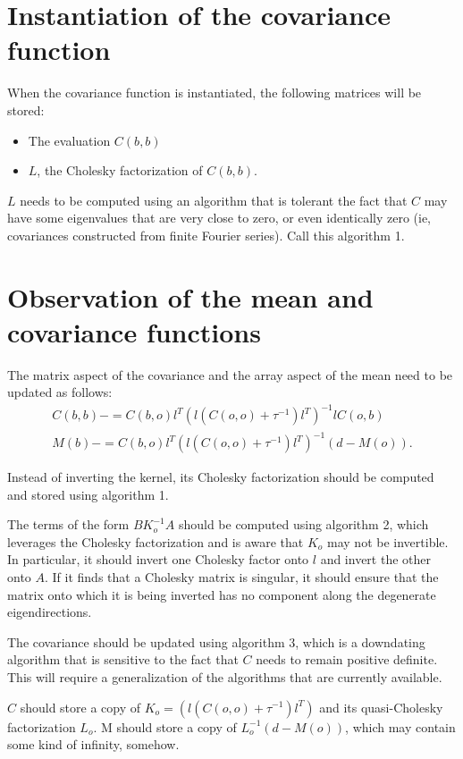 \documentclass{manual}
\begin{document}
\begin{itemize}
\section{Instantiation of the covariance function}\label{sec:covInstant} 
When the covariance function is instantiated, the following matrices will be stored:
\begin{itemize}
	\item The evaluation $C(b,b)$
	\item $L$, the Cholesky factorization of $C(b,b)$.
\end{itemize}
$L$ needs to be computed using an algorithm that is tolerant the fact that $C$ may have some eigenvalues that are very close to zero, or even identically zero (ie, covariances constructed from finite Fourier series). Call this algorithm 1.

\section{Observation of the mean and covariance functions}\label{sec:obsNumerics} 
The matrix aspect of the covariance and the array aspect of the mean need to be updated as follows:
\begin{eqnarray*}
	C(b,b) -= C(b,o) l^T (l(C(o,o) + \tau^{-1})l^T)^{-1} l C(o,b)\\
	M(b) -= C(b,o) l^T (l(C(o,o) + \tau^{-1})l^T)^{-1} (d-M(o)).
\end{eqnarray*}

Instead of inverting the kernel, its Cholesky factorization should be computed and stored using algorithm 1. 

The terms of the form $B K_o^{-1} A$ should be computed using algorithm 2, which leverages the Cholesky factorization and is aware that $K_o$ may not be invertible. In particular, it should invert one Cholesky factor onto $l$ and invert the other onto $A$. If it finds that a Cholesky matrix is singular, it should ensure that the matrix onto which it is being inverted has no component along the degenerate eigendirections.

The covariance should be updated using algorithm 3, which is a downdating algorithm that is sensitive to the fact that $C$ needs to remain positive definite. This will require a generalization of the algorithms that are currently available.

$C$ should store a copy of $K_o=(l(C(o,o) + \tau^{-1})l^T)$ and its quasi-Cholesky factorization $L_o$. M should store a copy of $L_o^{-1}(d-M(o))$, which may contain some kind of infinity, somehow.


\end{itemize}
\end{document}
